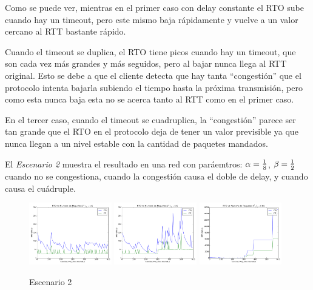		Como se puede ver, mientras en el primer caso con delay constante el RTO
		sube cuando hay un timeout, pero este mismo baja r\'apidamente y vuelve
		a un valor cercano al RTT bastante r\'apido.

		Cuando el timeout se duplica, el RTO tiene picos cuando hay un timeout,
		que son cada vez m\'as grandes y m\'as seguidos, pero al bajar nunca
		llega al RTT original. Esto se debe a que el cliente detecta que hay
		tanta ``congesti\'on'' que el protocolo intenta bajarla subiendo el
		tiempo hasta la pr\'oxima transmisi\'on, pero como esta nunca baja esta
		no se acerca tanto al RTT como en el primer caso.

		En el tercer caso, cuando el timeout se cuadruplica, la ``congesti\'on''
		parece ser tan grande que el RTO en el protocolo deja de tener un valor
		previsible ya que nunca llegan a un nivel estable con la cantidad de
		paquetes mandados.

        El \emph{Escenario 2} muestra el resultado en una red con
        par\'aemtros: $\alpha={{1}\over{8}}$, $\beta={{1}\over{2}}$
        cuando no se congestiona, cuando la congesti\'on causa el doble de
        delay, y cuando causa el cu\'adruple.

        \begin{figure}[H]
            \center

		    \includegraphics[width=0.32\textwidth]{imagenes/congestionb_1.pdf}
		    \includegraphics[width=0.32\textwidth]{imagenes/congestionb_2.pdf}
		    \includegraphics[width=0.32\textwidth]{imagenes/congestionb_4.pdf}

            \caption*{Escenario 2}

        \end{figure}

